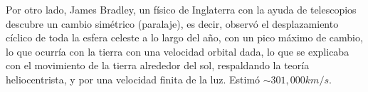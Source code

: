 \vspace{0.3cm}


Por otro lado, James Bradley, un físico de Inglaterra con la ayuda de telescopios descubre un cambio simétrico (paralaje), es decir, observó el desplazamiento cíclico de toda la esfera celeste a lo largo del año, con un pico máximo de cambio, lo que ocurría con la tierra con una velocidad orbital dada, lo que se explicaba con el movimiento de la tierra alrededor del sol, respaldando la teoría heliocentrista, y por una velocidad finita de la luz. Estimó $\sim 301,000 km/s$.







\vspace{0.3cm}



